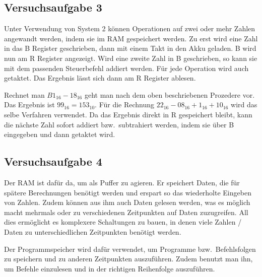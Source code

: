 \documentclass[10pt]{article}
\begin{document}
\begin{multicols}{2}
	\subsection{Versuchsaufgabe 3}
	Unter Verwendung von System 2 können Operationen auf zwei oder mehr Zahlen angewandt werden, indem sie im RAM gespeichert werden.
	Zu erst wird eine Zahl in das B Register geschrieben, dann mit einem Takt in den Akku geladen.
	B wird nun am R Register angezeigt.
	Wird eine zweite Zahl in B geschrieben, so kann sie mit dem passenden Steuerbefehl addiert werden.
	Für jede Operation wird auch getaktet.
	Das Ergebnis lässt sich dann am R Register ablesen.
	\par Rechnet man $B1_{16}-18_{16}$ geht man nach dem oben beschriebenen Prozedere vor.
	Das Ergebnis ist $99_{16}=153_{10}$.
	Für die Rechnung $22_{16}-08_{16}+1_{16}+10_{16}$ wird das selbe Verfahren verwendet.
	Da das Ergebnis direkt in R gespeichert bleibt, kann die nächste Zahl sofort addiert bzw.\ subtrahiert werden, indem sie über B eingegeben und dann getaktet wird.

	\subsection{Versuchsaufgabe 4}
	Der RAM ist dafür da, um als Puffer zu agieren.
	Er speichert Daten, die für spätere Berechnungen benötigt werden und erspart so das wiederholte Eingeben von Zahlen.
	Zudem können aus ihm auch Daten gelesen werden, was es möglich macht mehrmals oder zu verschiedenen Zeitpunkten auf Daten zuzugreifen.
	All dies ermöglicht es komplexere Schaltungen zu bauen, in denen viele Zahlen / Daten zu unterschiedlichen Zeitpunkten benötigt werden.
	\par Der Programmspeicher wird dafür verwendet, um Programme bzw.\ Befehlsfolgen zu speichern und zu anderen Zeitpunkten auszuführen.
	Zudem benutzt man ihn, um Befehle einzulesen und in der richtigen Reihenfolge auszuführen.


\end{multicols}
\end{document}

